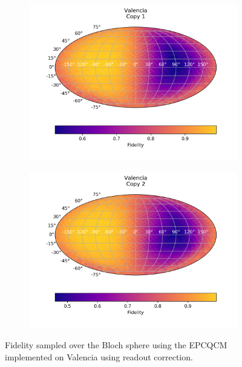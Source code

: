 \begin{figure}[H]
  \centering
  \begin{subfigure}{.5\textwidth}
    \centering
    \includegraphics[width=\textwidth]{Figures/Economical/IBM/FullSphere/results_corrected_valencia_copy1.png}
    \label{fig:epc_corrected_valencia_sphere_1}
  \end{subfigure}%
  \begin{subfigure}{.5\textwidth}
    \centering
    \includegraphics[width=\textwidth]{Figures/Economical/IBM/FullSphere/results_corrected_valencia_copy2.png}
    \label{fig:epc_corrected_valencia_sphere_2}
  \end{subfigure}
  \caption{Fidelity sampled over the Bloch sphere using the EPCQCM implemented on Valencia using readout correction.}
  \label{fig:epc_corrected_valencia_sphere}
\end{figure}

